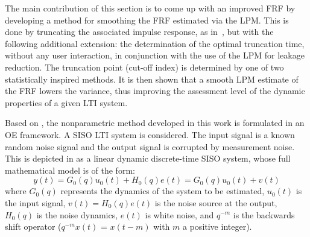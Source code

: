\label{sec:nonparametric:truncation}


The main contribution of this section is to come up with an improved \gls{FRF} by developing a method for smoothing the \gls{FRF} estimated via the \gls{LPM}. 
This is done by truncating the associated impulse response, as in~\citet{Schoukens1998}, but with the following additional extension: the determination of the optimal truncation time, without any user interaction, in conjunction with the use of the \gls{LPM} for leakage reduction. 
The truncation point (cut-off index) is determined by one of two statistically inspired methods.
It is then shown that a smooth \gls{LPM} estimate of the \gls{FRF} lowers the variance, thus improving the assessment level of the dynamic properties of a given \gls{LTI} system.

Based on \citet{Schoukens2009LPM}, the nonparametric method developed in this work is formulated in an \gls{OE} framework. 
A \gls{SISO} \gls{LTI} system is considered.
The input signal is a known random noise signal and the output signal is corrupted by measurement noise. This is depicted in  as a linear dynamic discrete-time \gls{SISO} system, whose full mathematical model is of the form:
\begin{equation}\label{eq:nparam:trunc:LPM:TD}
y(t)=G_0(q)u_0(t)+H_0(q)e(t)=G_0(q)u_0(t)+v(t)
\end{equation}
where $G_0(q)$ represents the dynamics of the system to be estimated, $u_0(t)$ is the input signal, $v(t)= H_0(q)e(t)$ is the noise source at the output, $H_0(q)$ is the noise dynamics, $e(t)$ is white noise, and $q^{-m}$ is the backwards shift operator ($q^{-m}x(t)$ = $x(t-m)$  with $m$ a positive integer).

